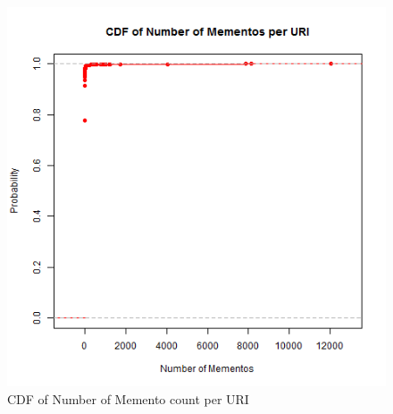 \begin{figure}[ht]
	\begin{center}
		 \includegraphics[scale=0.60]{memento_counts}
		  \caption{CDF of Number of Memento count per URI}
	 \end{center}
\end{figure}
\newpage
